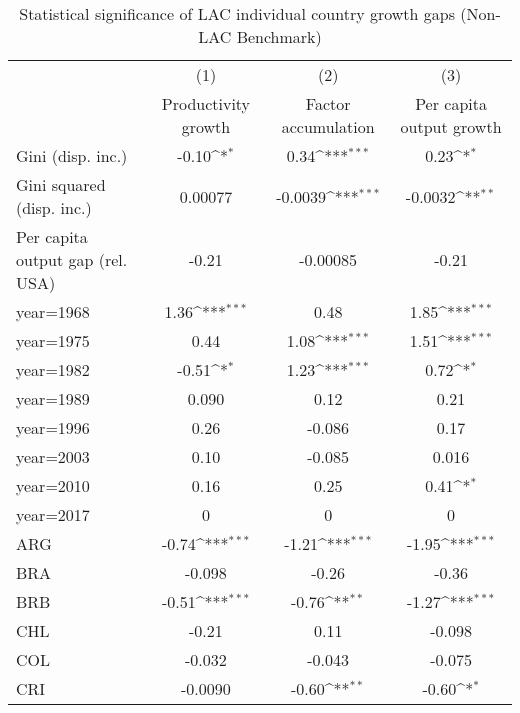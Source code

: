 \begin{sidewaystable}[htbp]\centering
\def\sym#1{\ifmmode^{#1}\else\(^{#1}\)\fi}
\caption{Statistical significance of LAC individual country growth gaps (Non-LAC Benchmark)}
\begin{tabular}{l*{3}{c}}
\toprule
                &\multicolumn{1}{c}{(1)}&\multicolumn{1}{c}{(2)}&\multicolumn{1}{c}{(3)}\\
                &\multicolumn{1}{c}{Productivity growth}&\multicolumn{1}{c}{Factor accumulation}&\multicolumn{1}{c}{Per capita output growth}\\
\midrule
Gini (disp. inc.)&    -0.10\sym{*}  &     0.34\sym{***}&     0.23\sym{*}  \\
Gini squared (disp. inc.)&  0.00077         &  -0.0039\sym{***}&  -0.0032\sym{**} \\
Per capita output gap (rel. USA)&    -0.21         & -0.00085         &    -0.21         \\
year=1968       &     1.36\sym{***}&     0.48         &     1.85\sym{***}\\
year=1975       &     0.44         &     1.08\sym{***}&     1.51\sym{***}\\
year=1982       &    -0.51\sym{*}  &     1.23\sym{***}&     0.72\sym{*}  \\
year=1989       &    0.090         &     0.12         &     0.21         \\
year=1996       &     0.26         &   -0.086         &     0.17         \\
year=2003       &     0.10         &   -0.085         &    0.016         \\
year=2010       &     0.16         &     0.25         &     0.41\sym{*}  \\
year=2017       &        0         &        0         &        0         \\
ARG             &    -0.74\sym{***}&    -1.21\sym{***}&    -1.95\sym{***}\\
BRA             &   -0.098         &    -0.26         &    -0.36         \\
BRB             &    -0.51\sym{***}&    -0.76\sym{**} &    -1.27\sym{***}\\
CHL             &    -0.21         &     0.11         &   -0.098         \\
COL             &   -0.032         &   -0.043         &   -0.075         \\
CRI             &  -0.0090         &    -0.60\sym{**} &    -0.60\sym{*}  \\

\end{tabular}
\end{sidewaystable}
